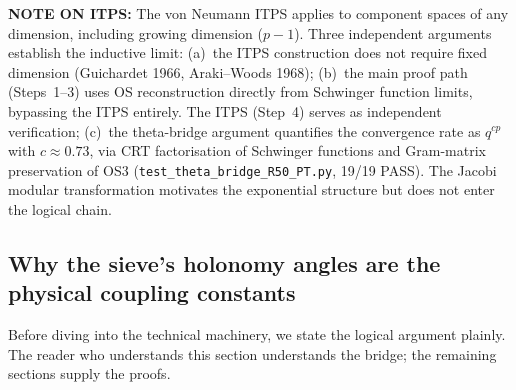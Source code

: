 \documentclass[12pt,a4paper]{article}
\begin{document}
\begin{statusbox}
\textbf{NOTE ON ITPS:}
  The von Neumann ITPS applies to component spaces of any
  dimension, including growing dimension ($p-1$).  Three
  independent arguments establish the inductive limit:
  (a)~the ITPS construction does not require fixed dimension
  (Guichardet 1966, Araki--Woods 1968);
  (b)~the main proof path (Steps~1--3) uses OS reconstruction
  directly from Schwinger function limits, bypassing the ITPS
  entirely.  The ITPS (Step~4) serves as independent verification;
  (c)~the theta-bridge argument quantifies the convergence rate
  as $q^{cp}$ with $c \approx 0.73$, via CRT factorisation of
  Schwinger functions and Gram-matrix preservation of OS3
  (\texttt{test\_theta\_bridge\_R50\_PT.py}, 19/19 PASS).
  The Jacobi modular transformation motivates the exponential
  structure but does not enter the logical chain.
\end{statusbox}

\subsection{Why the sieve's holonomy angles are the physical coupling constants}
\label{sec:ch9_why}

Before diving into the technical machinery, we state the logical
argument plainly.  The reader who understands this section understands
the bridge; the remaining sections supply the proofs.
\end{document}
